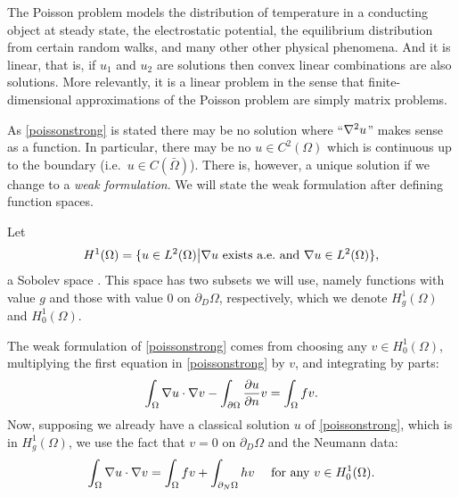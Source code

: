 The Poisson problem models the distribution of temperature in a conducting object at steady state, the electrostatic potential, the equilibrium distribution from certain random walks, and many other other physical phenomena.  And it is linear, that is, if $u_1$ and $u_2$ are solutions then convex linear combinations are also solutions.  More relevantly, it is a linear problem in the sense that finite-dimensional approximations of the Poisson problem are simply matrix problems.

As \eqref{poissonstrong} is stated there may be no solution where ``$\nabla^2 u$'' makes sense as a function.  In particular, there may be no $u\in C^2(\Omega)$ which is continuous up to the boundary (i.e.~$u\in C(\bar\Omega)$).  There is, however, a unique solution if we change to a \emph{weak formulation}.  We will state the weak formulation after defining function spaces.

Let
    $$H^1(\Omega) = \{u\in L^2(\Omega) \big| \nabla u \text{ exists a.e.~and } \nabla u \in L^2(\Omega)\},$$
a Sobolev space \citep{Evans}.  This space has two subsets we will use, namely functions with value $g$ and those with value $0$ on $\partial_D \Omega$, respectively, which we denote $H_g^1(\Omega)$ and $H_0^1(\Omega)$.

The weak formulation of \eqref{poissonstrong} comes from choosing any $v\in H_0^1(\Omega)$, multiplying the first equation in \eqref{poissonstrong} by $v$, and integrating by parts:
\begin{equation*}
\int_\Omega \nabla u \cdot \nabla v - \int_{\partial\Omega} \frac{\partial u}{\partial n} v = \int_\Omega f v.
\end{equation*}
Now,
supposing we already have a classical solution $u$ of \eqref{poissonstrong}, which is in $H_g^1(\Omega)$, we use the fact that $v=0$ on $\partial_D\Omega$ and the Neumann data:
\begin{equation}
\int_\Omega \nabla u \cdot \nabla v = \int_\Omega f v + \int_{\partial_N\Omega} h v\quad \text{ for any } v\in H_0^1(\Omega). \label{poissonweak}
\end{equation}

